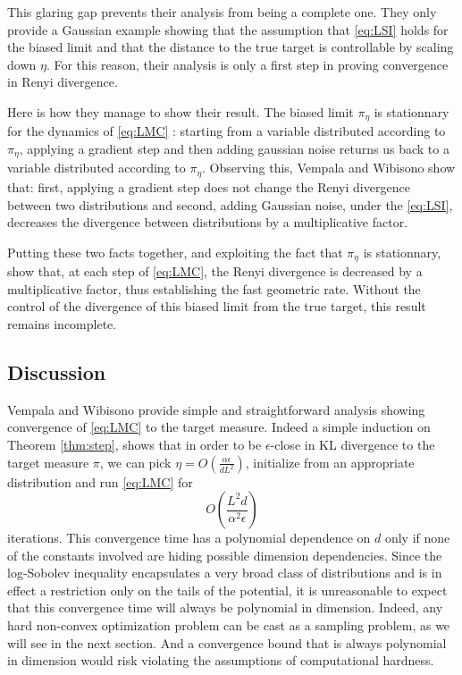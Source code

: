 \documentclass[11pt,twoside]{article}
\theoremstyle{definition}
\begin{document}
This glaring gap prevents their analysis from being a complete one. They only provide a Gaussian example showing that the assumption that \eqref{eq:LSI} holds for the biased limit and that the distance to the true target is controllable by scaling down $\eta$. For this reason, their analysis is only a first step in proving convergence in Renyi divergence.

Here is how they manage to show their result. The biased limit $\pi_\eta$ is stationnary for the dynamics of \eqref{eq:LMC} : starting from a variable distributed according to $\pi_\eta$, applying a gradient step and then adding gaussian noise returns us back to a variable distributed according to $\pi_\eta$. Observing this, Vempala and Wibisono show that: first, applying a gradient step does not change the Renyi divergence between two distributions and second, adding Gaussian noise, under the \eqref{eq:LSI}, decreases the divergence between distributions by a multiplicative factor.

Putting these two facts together, and exploiting the fact that $\pi_\eta$ is stationnary, \cite{vempala_rapid_2019} show that, at each step of \eqref{eq:LMC}, the Renyi divergence is decreased by a multiplicative factor, thus establishing the fast geometric rate. Without the control of the divergence of this biased limit from the true target, this result remains incomplete.

\subsection{Discussion}

Vempala and Wibisono provide simple and straightforward analysis showing convergence of \eqref{eq:LMC} to the target measure. Indeed a simple induction on Theorem \ref{thm:step}, shows that in order to be $\epsilon$-close in KL divergence to the target measure $\pi$, we can pick $\eta = O(\frac{\alpha \epsilon}{dL^2})$, initialize from an appropriate distribution and run \eqref{eq:LMC} for 
\[
O\left(\frac{L^2d}{\alpha^2\epsilon}\right)
\]
iterations. This convergence time has a polynomial dependence on $d$ only if none of the constants involved are hiding possible dimension dependencies. Since the log-Sobolev inequality encapsulates a very broad class of distributions and is in effect a restriction only on the tails of the potential, it is unreasonable to expect that this convergence time will always be polynomial in dimension. Indeed, any hard non-convex optimization problem can be cast as a sampling problem, as we will see in the next section. And a convergence bound that is always polynomial in dimension  would risk violating the assumptions of computational hardness.
\end{document}
